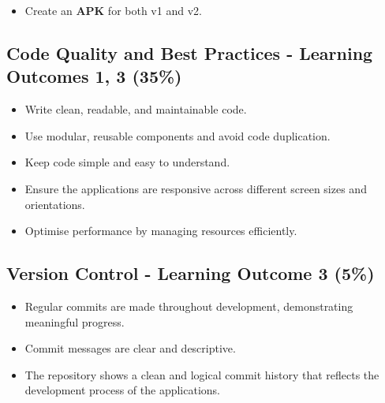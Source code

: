 \documentclass{article}
\begin{document}
\begin{itemize}
\begin{itemize}
    \item Select any four \textbf{Hard Features} from the list below:
    \begin{itemize}
      \item Save and edit notes on recipes.
      \item Add ratings and write reviews for recipes.
      \item View combined ratings and user reviews.
      \item Manage user profiles with preferences and dietary needs.
      \item Add new recipes.
      \item Update and delete existing recipes.
      \item Meal planner to schedule recipes by day.
    \end{itemize}

    \item Choose two features of your choice. These features should be different from the ones listed above.
  \end{itemize}

  \item Create an \textbf{APK} for both v1 and v2.
\end{itemize}

\subsection*{Code Quality and Best Practices - Learning Outcomes 1, 3 (35\%)}
\begin{itemize}
\item Write clean, readable, and maintainable code.
\item Use modular, reusable components and avoid code duplication.
\item Keep code simple and easy to understand.
\item Ensure the applications are responsive across different screen sizes and orientations.
\item Optimise performance by managing resources efficiently.
\end{itemize}

\subsection*{Version Control - Learning Outcome 3 (5\%)}
\begin{itemize}
  \item Regular commits are made throughout development, demonstrating meaningful progress.
  \item Commit messages are clear and descriptive.
  \item The repository shows a clean and logical commit history that reflects the development process of the applications.
\end{itemize} 
\end{document}
